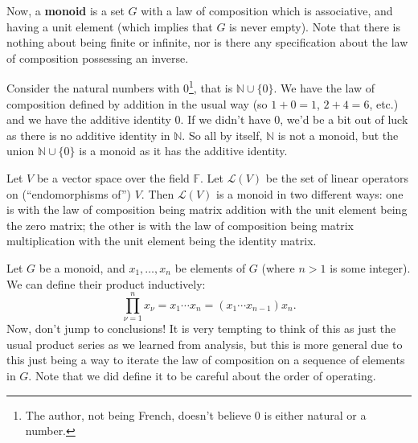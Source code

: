 Now, a \textbf{monoid} is a set $G$ with a law
of composition which is associative, and
having a unit element (which implies that $G$ is never
empty). Note that there is nothing about being finite or
infinite, nor is there any specification about the law of
composition possessing an inverse.

\begin{ex}
Consider the natural numbers with 0\footnote{The author, not
  being French, doesn't believe 0 is either natural or a number.},
that is
$\mathbb{N}\cup\{0\}$. We have the law of composition
defined by addition in the usual way (so $1+0=1$, $2+4=6$,
etc.) and we have the additive identity $0$. If we didn't
have 0, we'd be a bit out of luck as there is no additive
identity in $\mathbb{N}$. So all by itself, $\mathbb{N}$ is
not a monoid, but the union $\mathbb{N}\cup\{0\}$ is a
monoid as it has the additive identity. \qef
\end{ex}
\begin{ex}
Let $V$ be a vector space over the field $\mathbb{F}$. Let
$\mathcal{L}(V)$ be the set of linear operators on
(``endomorphisms of'') $V$. Then $\mathcal{L}(V)$ is a
monoid in two different ways: one is with the law of
composition being matrix addition with the unit element
being the zero matrix; the other is with the law of
composition being matrix multiplication with the unit
element being the identity matrix. \qef
\end{ex}

Let $G$ be a monoid, and $x_1,\ldots,x_n$ be elements of $G$
(where $n>1$ is some integer). We can define their product
inductively:
\begin{equation}
\prod^{n}_{\nu=1}x_{\nu}=x_1\cdots x_n = (x_1\cdots
x_{n-1})x_n.
\end{equation}
Now, don't jump to conclusions! It is very tempting to think
of this as just the usual product series as we learned from
analysis, but this is more general due to this just being a
way to iterate the law of composition on a sequence of
elements in $G$. Note that we did define it to be careful
about the order of operating. 

